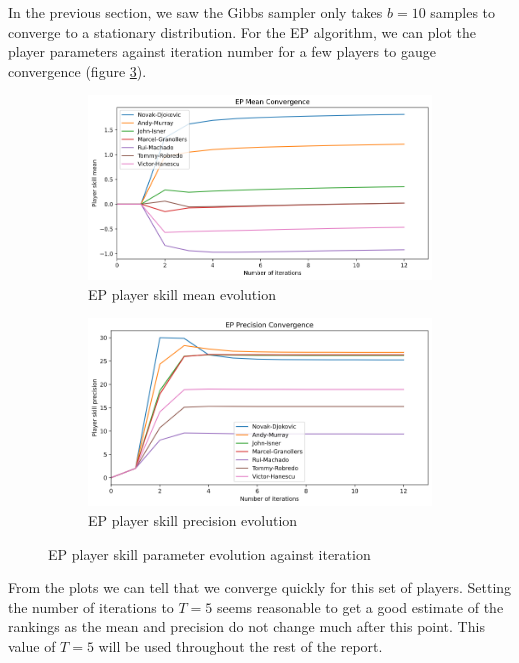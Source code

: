 \documentclass[]{article}
\begin{document}
In the previous section, we saw the Gibbs sampler only takes $b=10$ samples to converge to a stationary distribution. For the EP algorithm, we can plot the player parameters against iteration number for a few players to gauge convergence (figure \ref{fig:ep-evolution}).

\begin{figure}[!h]
	\begin{subfigure}{0.5\linewidth}
		\centering
		\includegraphics[width=\linewidth]{ep-mean.png}
		\caption{EP player skill mean evolution}
		\label{fig:ep-mean}
	\end{subfigure}
	\begin{subfigure}{0.5\linewidth}
		\centering
		\includegraphics[width=\linewidth]{ep-precision.png}
		\caption{EP player skill precision evolution}
		\label{fig:ep-precision}
	\end{subfigure}
	\caption{EP player skill parameter evolution against iteration}
	\label{fig:ep-evolution}
\end{figure}

From the plots we can tell that we converge quickly for this set of players. Setting the number of iterations to $T=5$ seems reasonable to get a good estimate of the rankings as the mean and precision do not change much after this point. This value of $T=5$ will be used throughout the rest of the report.
\end{document}
